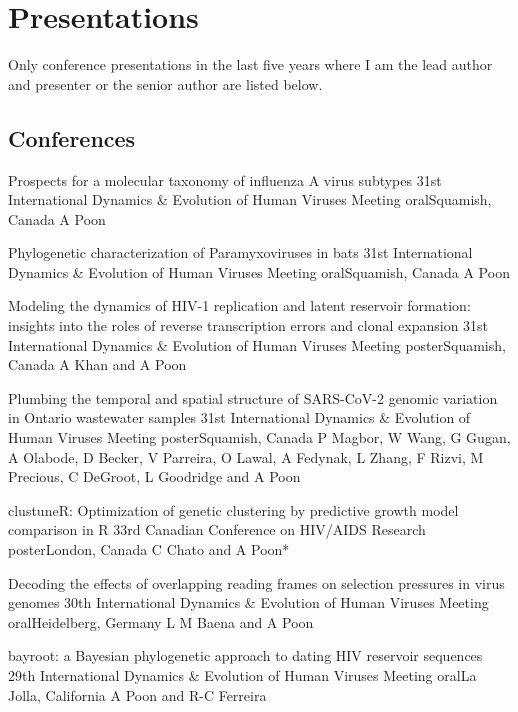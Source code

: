 
\section {Presentations}

Only conference presentations in the last five years where I am the lead author and presenter or the senior author are listed below.

\subsection {Conferences}

{Prospects for a molecular taxonomy of influenza A virus subtypes}
{31st International Dynamics \& Evolution of Human Viruses Meeting}
{oral}{Squamish, Canada}
{A Poon}

{Phylogenetic characterization of Paramyxoviruses in bats}
{31st International Dynamics \& Evolution of Human Viruses Meeting}
{oral}{Squamish, Canada}
{A Poon}

{Modeling the dynamics of HIV-1 replication and latent reservoir formation: insights into the roles of reverse transcription errors and clonal expansion}
{31st International Dynamics \& Evolution of Human Viruses Meeting}
{poster}{Squamish, Canada}
{A Khan and A Poon}

{Plumbing the temporal and spatial structure of SARS-CoV-2 genomic variation in Ontario wastewater samples}
{31st International Dynamics \& Evolution of Human Viruses Meeting}
{poster}{Squamish, Canada}
{P Magbor, W Wang, G Gugan, A Olabode, D Becker, V Parreira, O Lawal, A Fedynak, L Zhang, F Rizvi, M Precious, C DeGroot, L Goodridge and A Poon}

{clustuneR: Optimization of genetic clustering by predictive growth model comparison in R}
{33rd Canadian Conference on HIV/AIDS Research}
{poster}{London, Canada}
{C Chato and A Poon*}

{Decoding the effects of overlapping reading frames on selection pressures in virus genomes}
{30th International Dynamics \& Evolution of Human Viruses Meeting}
{oral}{Heidelberg, Germany}
{L M Baena and A Poon}

{bayroot: a Bayesian phylogenetic approach to dating HIV reservoir sequences}
{29th International Dynamics \& Evolution of Human Viruses Meeting}
{oral}{La Jolla, California}
{A Poon and R-C Ferreira}{}

